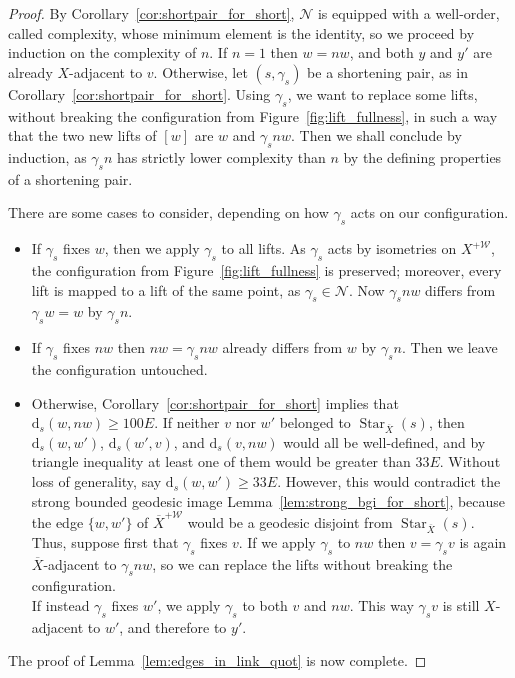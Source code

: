 \documentclass[svgnames]{amsart}
\theoremstyle{plain}
\theoremstyle{definition}
\newcommand{\ov}[1]{\overline{#1}}
\newcommand{\dist}{\mathrm{d}}
\newcommand{\N}{\mathcal{N}}
\newcommand{\W}{\mathcal{W}}
\begin{document}
\begin{proof}
By Corollary~\ref{cor:shortpair_for_short}, $\N$ is equipped with a well-order, called complexity, whose minimum element is the identity, so we proceed by induction on the complexity of $n$. If $n=1$ then $w=nw$, and both $y$ and $y'$ are already $X$-adjacent to $v$. Otherwise, let $(s, \gamma_s)$ be a shortening pair, as in Corollary~\ref{cor:shortpair_for_short}. Using $\gamma_s$, we want to replace some lifts, without breaking the configuration from Figure~\eqref{fig:lift_fullness}, in such a way that the two new lifts of $[w]$ are $w$ and $\gamma_s n w$. Then we shall conclude by induction, as $\gamma_s n$ has strictly lower complexity than $n$ by the defining properties of a shortening pair.

There are some cases to consider, depending on how $\gamma_s$ acts on our configuration.
\begin{itemize}
    \item If $\gamma_s$ fixes $w$, then we apply $\gamma_s$ to all lifts. As $\gamma_s$ acts by isometries on $X^{+\W}$, the configuration from Figure~\eqref{fig:lift_fullness} is preserved; moreover, every lift is mapped to a lift of the same point, as $\gamma_s\in \N$. Now $\gamma_s nw$ differs from $\gamma_s w=w$ by $\gamma_s n$.
    \item If $\gamma_s$ fixes $nw$ then $nw=\gamma_s n w$ already differs from $w$ by $\gamma_s n$. Then we leave the configuration untouched.
    \item Otherwise, Corollary~\ref{cor:shortpair_for_short}  implies that $\dist_s(w, nw)\ge 100E$. If neither $v$ nor $w'$ belonged to $\operatorname{Star}_{\ov X}(s)$, then $\dist_s(w, w')$, $\dist_s(w', v)$, and $\dist_s(v, nw)$ would all be well-defined, and by triangle inequality at least one of them would be greater than $33E$. Without loss of generality, say $\dist_s(w, w')\ge 33E$. However, this would contradict the strong bounded geodesic image Lemma~\ref{lem:strong_bgi_for_short}, because the edge $\{w, w'\}$ of $\ov X^{+\W}$ would be a geodesic disjoint from $\operatorname{Star}_{\ov X}(s)$. 
    \\
    Thus, suppose first that $\gamma_s$ fixes $v$. If we apply $\gamma_s$ to $nw$ then $v=\gamma_s v$ is again $\ov X$-adjacent to $\gamma_s n w$, so we can replace the lifts without breaking the configuration.
    \\
    If instead $\gamma_s$ fixes $w'$, we apply $\gamma_s$ to both $v$ and $nw$. This way $\gamma_s v$ is still $X$-adjacent to $w'$, and therefore to $y'$. 
\end{itemize}
The proof of Lemma~\ref{lem:edges_in_link_quot} is now complete.
\end{proof}
\end{document}
